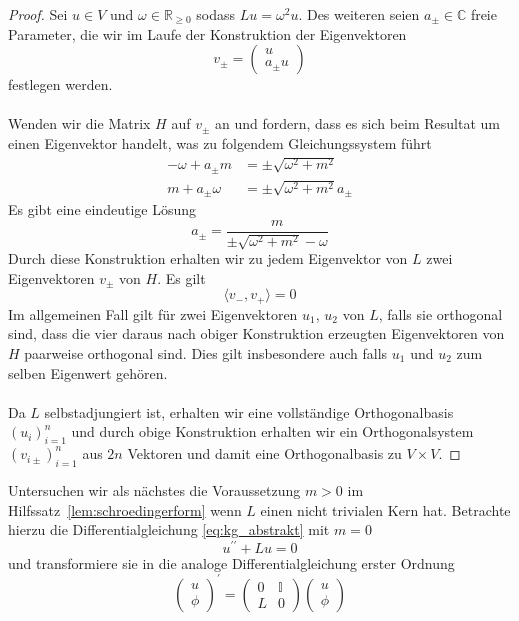 \documentclass[11pt,a4paper,leqno]{report}
\numberwithin{equation}{chapter}
\begin{document}
\begin{proof}
	Sei $u\in V$ und $\omega\in \mathbb{R}_{\geq 0}$ sodass $Lu = \omega^2 u$. Des weiteren seien $a_\pm\in\mathbb{C}$ freie Parameter, die wir im Laufe der Konstruktion der Eigenvektoren 
	\begin{equation*}
		v_\pm=\begin{pmatrix}
			u \\ a_\pm u
		\end{pmatrix}
	\end{equation*}
	festlegen werden.\\
	\\
	Wenden wir die Matrix $H$ auf $v_\pm$ an und fordern, dass es sich beim Resultat um einen Eigenvektor handelt, was zu folgendem Gleichungssystem führt
	\begin{align*}
		-\omega + a_\pm m &= \pm\sqrt{\omega^2 + m^2}\\
		m + a_\pm\omega &= \pm\sqrt{\omega^2 + m^2}a_\pm
	\end{align*}
	Es gibt eine eindeutige Lösung
	\begin{equation*}
		a_\pm = \frac{m}{\pm\sqrt{\omega^2 + m^2}-\omega}
	\end{equation*} 
	Durch diese Konstruktion erhalten wir zu jedem Eigenvektor von $L$ zwei Eigenvektoren $v_\pm$ von $H$. Es gilt
	\begin{equation*}
		\langle v_-, v_+\rangle=0 
	\end{equation*}
	Im allgemeinen Fall gilt für zwei Eigenvektoren $u_1$, $u_2$ von $L$, falls sie orthogonal sind, dass die vier daraus nach obiger Konstruktion erzeugten Eigenvektoren von $H$ paarweise orthogonal sind. Dies gilt insbesondere auch falls $u_1$ und $u_2$ zum selben Eigenwert gehören.\\
	\\
	Da $L$ selbstadjungiert ist, erhalten wir eine vollständige Orthogonalbasis $(u_i)_{i=1}^n$ und durch obige Konstruktion erhalten wir ein Orthogonalsystem $(v_{i\pm})_{i=1}^n$ aus $2n$ Vektoren und damit eine Orthogonalbasis zu $V\times V$.
\end{proof}
\noindent
Untersuchen wir als n\"achstes die Voraussetzung $m>0$ im Hilfssatz~\ref{lem:schroedingerform} wenn $L$ einen nicht trivialen Kern hat.
Betrachte hierzu die Differentialgleichung \eqref{eq:kg_abstrakt} mit $m=0$
\begin{equation}
	u^{\prime \prime} + Lu =0
\end{equation}
und transformiere sie in die analoge Differentialgleichung erster Ordnung
\begin{equation}
	\begin{pmatrix}
		u  \\ \phi 
	\end{pmatrix}^\prime=
	\begin{pmatrix}
		0 & \mathbb{I} \\ 
		L & 0
	\end{pmatrix}
	\begin{pmatrix}
		u  \\ \phi 
	\end{pmatrix}
\end{equation}
\end{document}
